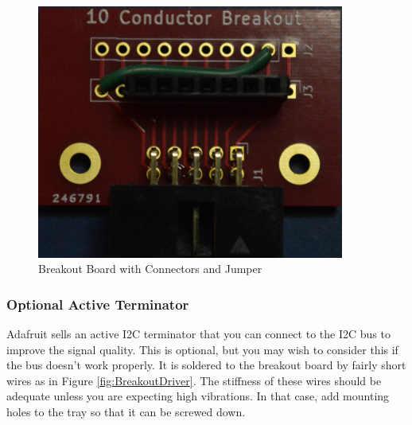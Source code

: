 \documentclass[10pt, openany]{book}
\begin{document}
\begin{figure}[ht!]
  \centering
  \includegraphics[width=0.9\textwidth]{../Pict/Breakout-Jumper.jpg}
  \caption{Breakout Board with Connectors and Jumper}
  \label{fig:BreakoutJumper}
\end{figure}

\subsubsection{Optional Active Terminator}
Adafruit sells an active I2C terminator that you can connect to the I2C bus to improve the signal quality.  This is optional, but you may wish to consider this if the bus doesn't work properly.  It is soldered to the breakout board by fairly short wires as in Figure \ref{fig:BreakoutDriver}.  The stiffness of these wires should be adequate unless you are expecting high vibrations.  In that case, add mounting holes to the tray so that it can be screwed down.
\end{document}
